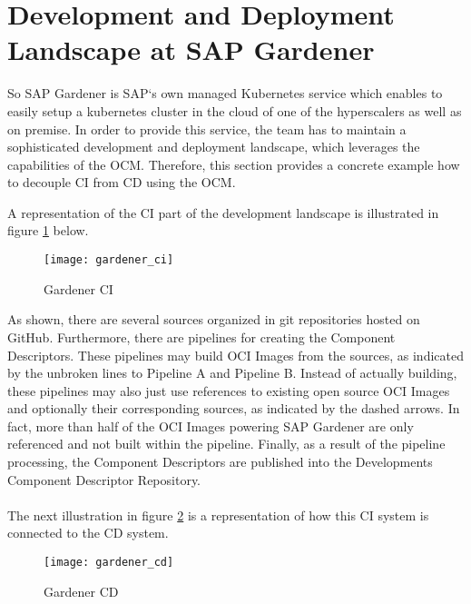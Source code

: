 \section{Development and Deployment Landscape at SAP Gardener} \label{sec:Development and Deployment Landscape at SAP Gardener}
So SAP Gardener is SAP`s own managed Kubernetes service which enables to easily setup a kubernetes cluster in the cloud of one of the hyperscalers as well as on premise. In order to provide this service, the team has to maintain a sophisticated development and deployment landscape, which leverages the capabilities of the OCM. Therefore, this section provides a concrete example how to decouple CI from CD using the OCM.\par
A representation of the CI part of the development landscape is illustrated in figure \ref{fig:GardenerCI} below.

\begin{figure}[H]
	\centering
	\texttt{[image: gardener\_ci]}
	\caption[Gardener CI]{Gardener CI }
	\label{fig:GardenerCI}
\end{figure}

As shown, there are several sources organized in git repositories hosted on GitHub. Furthermore, there are pipelines for creating the Component Descriptors. These pipelines may build OCI Images from the sources, as indicated by the unbroken lines to Pipeline A and Pipeline B. Instead of actually building, these pipelines may also just use references to existing open source OCI Images and optionally their corresponding sources, as indicated by the dashed arrows. In fact, more than half of the OCI Images powering SAP Gardener are only referenced and not built within the pipeline. Finally, as a result of the pipeline processing, the Component Descriptors are published into the Developments Component Descriptor Repository.\\\\
The next illustration in figure \ref{fig:GardenerCD} is a representation of how this CI system is connected to the CD system.

\begin{figure}[H]
	\centering
	\texttt{[image: gardener\_cd]}
	\caption[Gardener CD]{Gardener CD }
	\label{fig:GardenerCD}
\end{figure}
 
